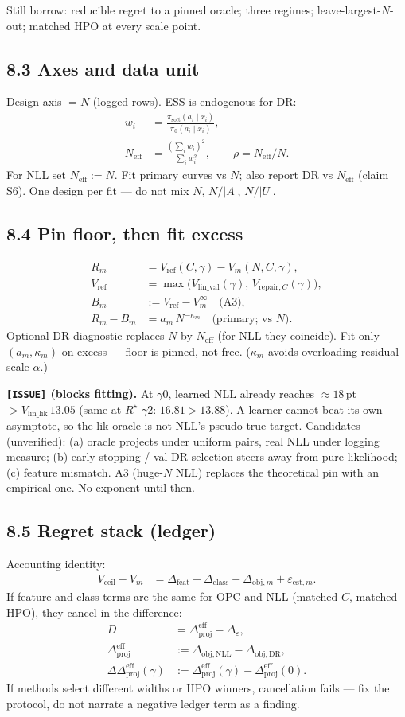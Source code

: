 \documentclass[11pt]{article}
\newcommand{\phonesub}[1]{\Needspace{6\baselineskip}\subsection*{#1}}
\newcommand{\stag}[1]{\texttt{[#1]}}
\newcommand{\Rstar}{R^{\star}}
\newcommand{\Dprojeff}{\Delta_{\mathrm{proj}}^{\mathrm{eff}}}
\newcommand{\DDprojeff}{\Delta\Delta_{\mathrm{proj}}^{\mathrm{eff}}}
\newcommand{\Neff}{N_{\mathrm{eff}}}
\begin{document}
Still borrow: reducible regret to a pinned
oracle; three regimes; leave-largest-$N$-out;
matched HPO at every scale point.

\phonesub{8.3 Axes and data unit}
Design axis $=N$ (logged rows).  ESS is
endogenous for DR:
\begin{align*}
w_{i}
  &= \frac{\pi_{\mathrm{soft}}(a_{i}\mid x_{i})}
         {\pi_{0}(a_{i}\mid x_{i})},\\
\Neff
  &= \frac{(\sum_{i} w_{i})^{2}}
         {\sum_{i} w_{i}^{2}},\qquad
\rho=\Neff/N.
\end{align*}
For NLL set $\Neff:=N$.  Fit primary curves
vs $N$; also report DR vs $\Neff$ (claim S6).
One design per fit --- do not mix
$N$, $N/|A|$, $N/|U|$.

\phonesub{8.4 Pin floor, then fit excess}
\begin{align*}
R_{m}
  &= V_{\mathrm{ref}}(C,\gamma)
   - V_{m}(N,C,\gamma),\\
V_{\mathrm{ref}}
  &= \max\!\big(
       V_{\mathrm{lin\_val}}(\gamma),\,
       V_{\mathrm{repair},C}(\gamma)
     \big),\\
B_{m}
  &:= V_{\mathrm{ref}}-V_{m}^{\infty}
  \quad\text{(A3)},\\
R_{m}-B_{m}
  &= a_{m}\,N^{-\kappa_{m}}
  \quad\text{(primary; vs $N$)}.
\end{align*}
Optional DR diagnostic replaces $N$ by
$\Neff$ (for NLL they coincide).  Fit only
$(a_{m},\kappa_{m})$ on excess --- floor is
pinned, not free.  ($\kappa_{m}$ avoids
overloading residual scale $\alpha$.)

\textbf{\stag{ISSUE} (blocks fitting).}
At $\gamma0$, learned NLL already reaches
$\approx 18$\,pt $> V_{\mathrm{lin\_lik}}\,13.05$
(same at $\Rstar$ $\gamma2$: $16.81>13.88$).
A learner cannot beat its own asymptote, so
the lik-oracle is not NLL's pseudo-true
target.  Candidates (unverified): (a) oracle
projects under uniform pairs, real NLL under
logging measure; (b) early stopping /
val-DR selection steers away from pure
likelihood; (c) feature mismatch.  A3
(huge-$N$ NLL) replaces the theoretical pin
with an empirical one.  No exponent until
then.

\phonesub{8.5 Regret stack (ledger)}
Accounting identity:
\begin{align*}
V_{\mathrm{ceil}}-V_{m}
  &= \Delta_{\mathrm{feat}}
   + \Delta_{\mathrm{class}}
   + \Delta_{\mathrm{obj},m}
   + \varepsilon_{\mathrm{est},m}.
\end{align*}
If feature and class terms are the same for
OPC and NLL (matched $C$, matched HPO), they
cancel in the difference:
\begin{align*}
D
  &= \Dprojeff-\Delta_{\varepsilon},\\
\Dprojeff
  &:= \Delta_{\mathrm{obj},\mathrm{NLL}}
    - \Delta_{\mathrm{obj},\mathrm{DR}},\\
\DDprojeff(\gamma)
  &:= \Dprojeff(\gamma)-\Dprojeff(0).
\end{align*}
If methods select different widths or HPO
winners, cancellation fails --- fix the
protocol, do not narrate a negative ledger
term as a finding.
\end{document}
